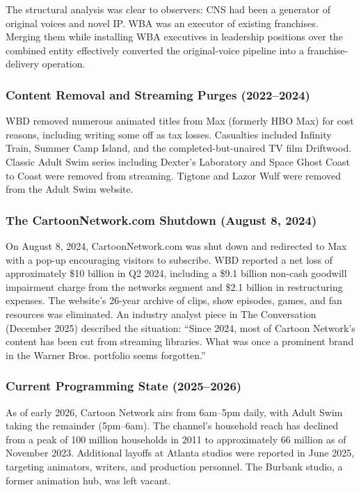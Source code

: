 \documentclass[11pt,letterpaper]{article}
\begin{document}
The structural analysis was clear to observers: CNS had been a generator of original voices and novel IP. WBA was an executor of existing franchises. Merging them while installing WBA executives in leadership positions over the combined entity effectively converted the original-voice pipeline into a franchise-delivery operation.

\subsubsection{Content Removal and Streaming Purges (2022--2024)}

WBD removed numerous animated titles from Max (formerly HBO Max) for cost reasons, including writing some off as tax losses. Casualties included Infinity Train, Summer Camp Island, and the completed-but-unaired TV film Driftwood. Classic Adult Swim series including Dexter's Laboratory and Space Ghost Coast to Coast were removed from streaming. Tigtone and Lazor Wulf were removed from the Adult Swim website.

\subsubsection{The CartoonNetwork.com Shutdown (August 8, 2024)}

On August 8, 2024, CartoonNetwork.com was shut down and redirected to Max with a pop-up encouraging visitors to subscribe. WBD reported a net loss of approximately \$10 billion in Q2 2024, including a \$9.1 billion non-cash goodwill impairment charge from the networks segment and \$2.1 billion in restructuring expenses. The website's 26-year archive of clips, show episodes, games, and fan resources was eliminated. An industry analyst piece in The Conversation (December 2025) described the situation: ``Since 2024, most of Cartoon Network's content has been cut from streaming libraries. What was once a prominent brand in the Warner Bros. portfolio seems forgotten.''

\subsubsection{Current Programming State (2025--2026)}

As of early 2026, Cartoon Network airs from 6am--5pm daily, with Adult Swim taking the remainder (5pm--6am). The channel's household reach has declined from a peak of 100 million households in 2011 to approximately 66 million as of November 2023. Additional layoffs at Atlanta studios were reported in June 2025, targeting animators, writers, and production personnel. The Burbank studio, a former animation hub, was left vacant.
\end{document}
